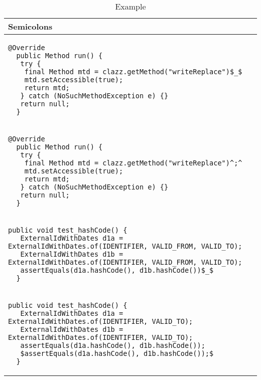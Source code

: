 \begin{table}[p]
\begin{tabular}{ | m{11cm} | }
  \hline
  Semicolons \\
  \hline
  {\begin{lstlisting}[style=table]
  @Override
  public Method run() {
   try {
    final Method mtd = clazz.getMethod("writeReplace")$_$
    mtd.setAccessible(true);
    return mtd;
   } catch (NoSuchMethodException e) {}
   return null;
  }
  \end{lstlisting}} \\
  {\begin{lstlisting}[style=table]
  @Override
  public Method run() {
   try {
    final Method mtd = clazz.getMethod("writeReplace")^;^
    mtd.setAccessible(true);
    return mtd;
   } catch (NoSuchMethodException e) {}
   return null;
  }
  \end{lstlisting}} \\
  \hline
  \hline
  {\begin{lstlisting}[style=table]
  public void test_hashCode() {
   ExternalIdWithDates d1a = ExternalIdWithDates.of(IDENTIFIER, VALID_FROM, VALID_TO);
   ExternalIdWithDates d1b = ExternalIdWithDates.of(IDENTIFIER, VALID_FROM, VALID_TO);
   assertEquals(d1a.hashCode(), d1b.hashCode())$_$
  }
  \end{lstlisting}} \\
  {\begin{lstlisting}[style=table]
  public void test_hashCode() {
   ExternalIdWithDates d1a = ExternalIdWithDates.of(IDENTIFIER, VALID_TO);
   ExternalIdWithDates d1b = ExternalIdWithDates.of(IDENTIFIER, VALID_TO);
   assertEquals(d1a.hashCode(), d1b.hashCode());
   $assertEquals(d1a.hashCode(), d1b.hashCode());$
  }
  \end{lstlisting}} \\
  \hline
\end{tabular}
\caption{Example}
\label{semicolon_showcase_table}
\end{table}

